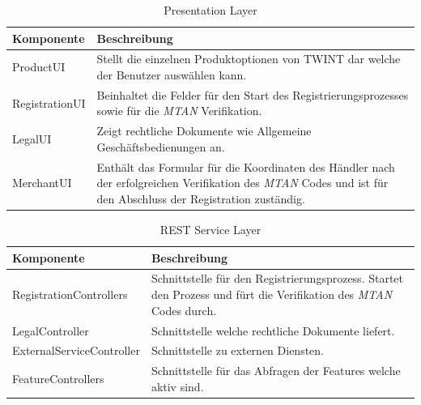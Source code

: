 \begin{table}[H]
	\centering
	\caption{Presentation Layer}
	\begin{tabular}{ | p{4.5cm} | p{10.5cm} | }
		\toprule
		{\textbf{Komponente}} & {\textbf{Beschreibung}} \\
		\midrule
		ProductUI &  Stellt die einzelnen Produktoptionen von TWINT dar welche der Benutzer auswählen kann.\\ \hline
		RegistrationUI  &  Beinhaltet die Felder für den Start des Registrierungsprozesses sowie für die \textit{\gls{MTAN}} Verifikation.\\ \hline
		LegalUI &  Zeigt rechtliche Dokumente wie Allgemeine Geschäftsbedienungen an.\\ \hline
		MerchantUI & Enthält das Formular für die Koordinaten des Händler nach der erfolgreichen Verifikation des \textit{\gls{MTAN}} Codes und ist für den Abschluss der Registration zuständig.\\
		\bottomrule
	\end{tabular}
\end{table}

\begin{table}[H]
	\centering
	\caption{REST Service Layer}
	\begin{tabular}{ | p{4.5cm} | p{10.5cm} | }
		\toprule
		{\textbf{Komponente}} & {\textbf{Beschreibung}} \\
		\midrule
		RegistrationControllers &  Schnittstelle für den Registrierungsprozess. Startet den Prozess und fürt die Verifikation des \textit{\gls{MTAN}} Codes durch.\\ \hline
		LegalController &  Schnittstelle welche rechtliche Dokumente liefert. \\ \hline
		ExternalServiceController &  Schnittstelle zu externen Diensten. \\ \hline
		FeatureControllers & Schnittstelle für das Abfragen der Features welche aktiv sind. \\
		\bottomrule
	\end{tabular}
\end{table}

